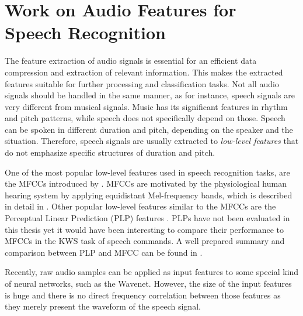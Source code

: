 
\section{Work on Audio Features for Speech Recognition}\label{sec:prev_features}
The feature extraction of audio signals is essential for an efficient data compression and extraction of relevant information.
This makes the extracted features suitable for further processing and classification tasks.
Not all audio signals should be handled in the same manner, as for instance, speech signals are very different from musical signals.
Music has its significant features in rhythm and pitch patterns, while speech does not specifically depend on those.
Speech can be spoken in different duration and pitch, depending on the speaker and the situation.
Therefore, speech signals are usually extracted to \emph{low-level features} that do not emphasize specific structures of duration and pitch.

One of the most popular low-level features used in speech recognition tasks, are the MFCCs introduced by \cite{Mermelstein1980}.
MFCCs are motivated by the physiological human hearing system by applying equidistant Mel-frequency bands, which is described in detail in .
Other popular low-level features similar to the MFCCs are the Perceptual Linear Prediction (PLP) features \cite{Hermansky1987}.
PLPs have not been evaluated in this thesis yet it would have been interesting to compare their performance to MFCCs in the KWS task of speech commands.
A well prepared summary and comparison between PLP and MFCC can be found in \cite{Hoenig2005}.

Recently, raw audio samples can be applied as input features to some special kind of neural networks, such as the Wavenet. 
However, the size of the input features is huge and there is no direct frequency correlation between those features as they merely present the waveform of the speech signal.